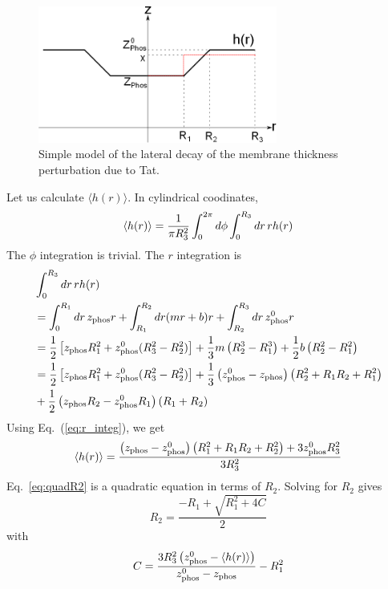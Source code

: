 \begin{figure}[htbp]
  \centering
  \includegraphics[width=0.7\textwidth]{./figures/Tat/linear_model}
  \caption{Simple model of the lateral decay of the membrane thickness 
  perturbation due to Tat.}
  \label{fig:linear_model}
\end{figure}

Let us calculate $\langle h(r) \rangle$. In cylindrical coodinates, 
\begin{equation}
  \langle h(r) \rangle 
  = \frac{1}{\pi R_3^2} \int_0^{2\pi}d\phi \int_0^{R_3}\mathop{dr} rh(r)
\end{equation}
The $\phi$ integration is trivial. The $r$ integration is
\begin{align}
  & \int_0^{R_3}\mathop{dr} rh(r) \nonumber\\
  &= \int_0^{R_1}\mathop{dr} z_\textrm{phos} r + \int_{R_1}^{R_2}\mathop{dr} (mr+b)r + \int_{R_2}^{R_3}\mathop{dr} z_\textrm{phos}^0r \nonumber\\
  &= \frac{1}{2}\left[z_\textrm{phos} R_1^2+z_\textrm{phos}^0(R_3^2-R_2^2)\right] + 
     \frac{1}{3}m\left(R_2^3-R_1^3\right) + 
     \frac{1}{2}b\left(R_2^2-R_1^2\right) \nonumber\\        
  &= \frac{1}{2}\left[z_\textrm{phos} R_1^2+z_\textrm{phos}^0(R_3^2-R_2^2)\right] +
     \frac{1}{3}\left(z_\textrm{phos}^0-z_\textrm{phos}\right)\left(R_2^2+R_1R_2+R_1^2\right) \nonumber\\
  &  + \frac{1}{2}\left(z_\textrm{phos} R_2-z_\textrm{phos}^0 R_1\right)\left(R_1+R_2\right) \label{eq:r_integ}
\end{align}
Using Eq.~(\ref{eq:r_integ}), we get 
\begin{equation}
  \langle h(r) \rangle 
  = \frac{\left(z_\textrm{phos}-z_\textrm{phos}^0\right)\left(R_1^2+R_1R_2+R_2^2\right)+3z_\textrm{phos}^0R_3^2}{3R_3^2}
  \label{eq:quadR2}
\end{equation}
Eq.~\ref{eq:quadR2} is a quadratic equation in terms of $R_2$. 
Solving for $R_2$ gives
\begin{equation}
  R_2 = \frac{-R_1+\sqrt{R_1^2+4C}}{2} 
\end{equation}
with
\begin{equation}
  C = \frac{3R_3^2\left(z_\textrm{phos}^0-\langle h(r)\rangle\right)}{z_\textrm{phos}^0-z_\textrm{phos}} - R_1^2
\end{equation}

